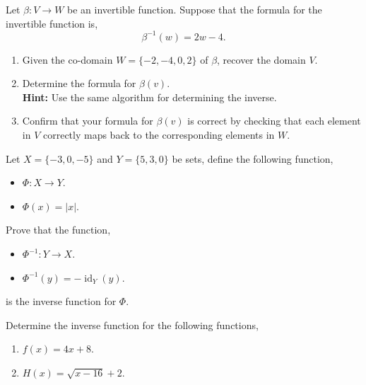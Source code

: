 \documentclass[12pt]{article} %
\begin{document}
\begin{qstn}
  Let $\beta \colon V \to W$ be an invertible function. Suppose that the formula for the invertible function is,
  \[
      \beta^{-1}(w) = 2w - 4
  .\] 
  \begin{enumerate}[label=(\alph*)]
    \item Given the co-domain $W = \{-2,-4,0,2\} $ of $\beta$, recover the domain $V$.

    \vspace*{6cm}

  \item Determine the formula for $\beta(v)$.\\
    \textbf{Hint: }Use the same algorithm for determining the inverse.

    \vspace*{4cm}

  \item Confirm that your formula for $\beta(v)$ is correct by checking that each element in $V$ correctly maps back to the corresponding
        elements in $W$.

  \end{enumerate}
\end{qstn}

\newpage

\begin{qstn}
Let $ X = \{-3,0,-5\} $ and $ Y = \{5,3,0\} $ be sets, define the following function, 
\begin{itemize}
    \item $\Phi \colon X \to Y$.
    \item $\Phi(x) = \left|x\right|$.
\end{itemize}

Prove that the function,
\begin{itemize}
    \item $\Phi^{-1} \colon Y \to X$.
    \item $\Phi^{-1}(y) = -\operatorname{id}_Y(y)$.
\end{itemize}
is the inverse function for $\Phi$.

\end{qstn}


\newpage


\begin{qstn}
  Determine the inverse function for the following functions,
  \begin{enumerate}[label=(\alph*)]
    \item $f(x) = 4x + 8$.
        \vspace*{8cm}

    \item $H(x) = \sqrt{x - 16} + 2$.
  \end{enumerate}
\end{qstn}
\end{document}
